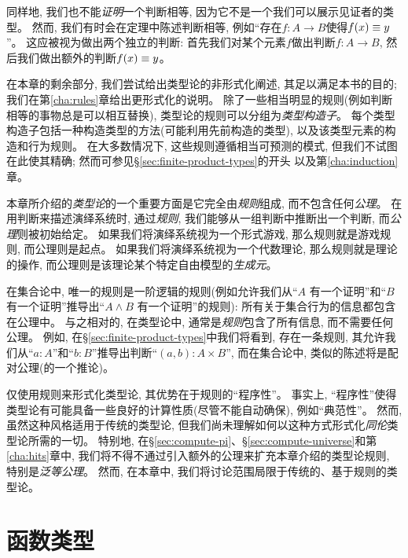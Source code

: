 同样地, 我们也不能\emph{证明}一个判断相等, 因为它不是一个我们可以展示见证者的类型。
然而, 我们有时会在定理中陈述判断相等, 例如``存在$f:A\to B$使得$f(x)\equiv y$''。
这应被视为做出两个独立的判断: 首先我们对某个元素$f$做出判断$f:A\to B$, 然后我们做出额外的判断$f(x)\equiv y$。

在本章的剩余部分, 我们尝试给出类型论的非形式化阐述, 其足以满足本书的目的; 我们在第\ref{cha:rules}章给出更形式化的说明。
除了一些相当明显的规则(例如判断相等的事物总是可以相互替换), 
类型论的规则可以分组为\emph{类型构造子}。
每个类型构造子包括一种构造类型的方法(可能利用先前构造的类型), 以及该类型元素的构造和行为规则。
在大多数情况下, 这些规则遵循相当可预测的模式, 但我们不试图在此使其精确; 然而可参见\S\ref{sec:finite-product-types}的开头
以及第\ref{cha:induction}章。

%
%
本章所介绍的\emph{类型论}的一个重要方面是它完全由\emph{规则}组成, 而不包含任何\emph{公理}。
在用判断来描述演绎系统时, 通过\emph{规则}, 我们能够从一组判断中推断出一个判断, 而\emph{公理}则被初始给定。
如果我们将演绎系统视为一个形式游戏, 那么规则就是游戏规则, 而公理则是起点。
如果我们将演绎系统视为一个代数理论, 那么规则就是理论的操作, 而公理则是该理论某个特定自由模型的\emph{生成元}。

在集合论中, 唯一的规则是一阶逻辑的规则(例如允许我们从``$A$ 有一个证明''和``$B$ 有一个证明''推导出``$A\wedge B$ 有一个证明''的规则): 所有关于集合行为的信息都包含在公理中。
与之相对的, 在类型论中, 通常是\emph{规则}包含了所有信息, 而不需要任何公理。
例如, 在\S\ref{sec:finite-product-types}中我们将看到, 存在一条规则, 其允许我们从``$a:A$''和``$b:B$''推导出判断``$(a,b):A\times B$'', 
而在集合论中, 类似的陈述将是配对公理(的一个推论)。

仅使用规则来形式化类型论, 其优势在于规则的``程序性''。
事实上, ``程序性''使得类型论有可能具备一些良好的计算性质(尽管不能自动确保), 例如``典范性''。
然而, 虽然这种风格适用于传统的类型论, 但我们尚未理解如何以这种方式形式化\emph{同伦}类型论所需的一切。
特别地, 在\S\ref{sec:compute-pi}、\S\ref{sec:compute-universe}和第\ref{cha:hits}章中, 我们将不得不通过引入额外的公理来扩充本章介绍的类型论规则, 特别是\emph{泛等公理}。
然而, 在本章中, 我们将讨论范围局限于传统的、基于规则的类型论。

\section{函数类型}
\label{sec:function-types}

